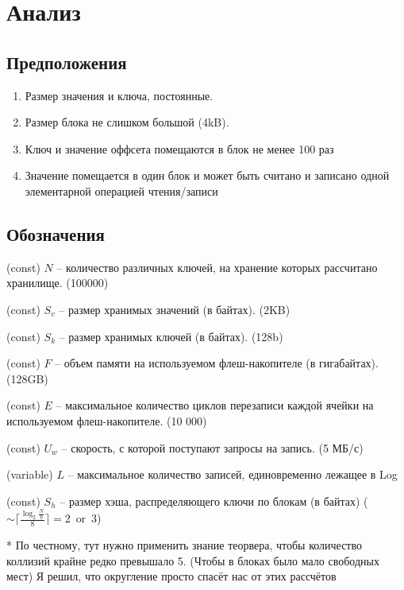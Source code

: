 \section*{Анализ}

\subsection*{Предположения}
\begin{enumerate}
	\item Размер значения и ключа, постоянные.
	
	\item Размер блока не слишком большой (4kB).
	
	\item Ключ и значение оффсета помещаются в блок не менее 100 раз
	
	\item Значение помещается в один блок и может быть считано и записано одной элементарной операцией чтения/записи
	
\end{enumerate}
\newpage
\subsection*{Обозначения}

(const) $N$ -- количество различных ключей, на хранение которых рассчитано хранилище. (100000)

(const) $S_v$ -- размер хранимых значений (в байтах). (2KB)

(const) $S_k$ -- размер хранимых ключей (в байтах). (128b)

(const) $F$ -- объем памяти на используемом флеш-накопителе (в гигабайтах). (128GB)

(const) $E$ -- максимальное количество циклов перезаписи каждой ячейки на используемом флеш-накопителе. (10 000)

(const) $U_w$ -- скорость, с которой поступают запросы на запись. (5 МБ/с)

(variable) $L$ -- максимальное количество записей, единовременно лежащее в Log

(const) $S_h$ -- размер хэша, распределяющего ключи по блокам (в байтах) ($\sim\lceil\frac{\log_2 \frac{N}{b}}{8}\rceil = 2\ \operatorname{or}\ 3$)

* По честному, тут нужно применить знание теорвера, чтобы количество коллизий крайне редко превышало 5. (Чтобы в блоках было мало свободных мест) Я решил, что округление просто спасёт нас от этих рассчётов


